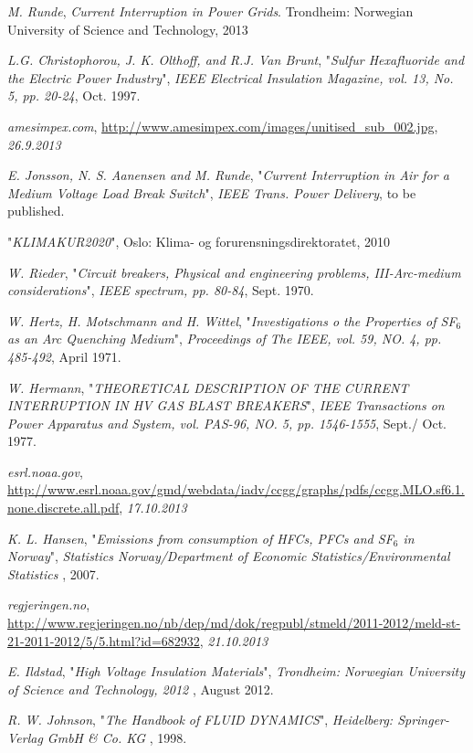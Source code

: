 \documentclass[10pt,a4paper]{article} %
\begin{document}
\begin{thebibliography}{10}


 \textit{M. Runde}, \textit{Current Interruption in Power Grids}. Trondheim: Norwegian University of Science and Technology, 2013

 \textit{L.G. Christophorou, J. K. Olthoff, and R.J. Van Brunt}, "\textit{Sulfur Hexafluoride and the Electric Power Industry}", \textit{IEEE Electrical Insulation Magazine, vol. 13, No. 5, pp. 20-24}, Oct. 1997.

 \textit{amesimpex.com}, \url{http://www.amesimpex.com/images/unitised_sub_002.jpg}, \textit{26.9.2013}

 \textit{E. Jonsson, N. S. Aanensen and M. Runde}, "\textit{Current Interruption in Air for a Medium Voltage Load Break Switch}", \textit{IEEE Trans. Power Delivery}, to be published.

 "\textit{KLIMAKUR2020}", Oslo: Klima- og forurensningsdirektoratet, 2010

 \textit{W. Rieder}, "\textit{Circuit breakers, Physical and engineering problems, III-Arc-medium considerations}", \textit{IEEE spectrum, pp. 80-84}, Sept. 1970.

 \textit{W. Hertz, H. Motschmann and H. Wittel}, "\textit{Investigations o the Properties of SF$_6$ as an Arc Quenching Medium}", \textit{Proceedings of The IEEE, vol. 59, NO. 4, pp. 485-492}, April 1971.

 \textit{W. Hermann}, "\textit{THEORETICAL DESCRIPTION OF THE CURRENT INTERRUPTION IN HV GAS BLAST BREAKERS}", \textit{IEEE Transactions on Power Apparatus and System, vol. PAS-96, NO. 5, pp. 1546-1555}, Sept./ Oct. 1977.

 \textit{esrl.noaa.gov}, \url{http://www.esrl.noaa.gov/gmd/webdata/iadv/ccgg/graphs/pdfs/ccgg.MLO.sf6.1.none.discrete.all.pdf}, \textit{17.10.2013}

 \textit{K. L. Hansen}, "\textit{Emissions from consumption of HFCs, PFCs and SF$_6$ in Norway}", \textit{Statistics Norway/Department of Economic Statistics/Environmental Statistics
}, 2007.

 \textit{regjeringen.no}, \url{http://www.regjeringen.no/nb/dep/md/dok/regpubl/stmeld/2011-2012/meld-st-21-2011-2012/5/5.html?id=682932}, \textit{21.10.2013}



 \textit{E. Ildstad}, "\textit{High Voltage Insulation Materials}", \textit{Trondheim: Norwegian University of Science and Technology, 2012
}, August 2012.

 \textit{R. W. Johnson}, "\textit{The Handbook of FLUID DYNAMICS}", \textit{Heidelberg: Springer-Verlag GmbH \& Co. KG
}, 1998.

\end{thebibliography}
\end{document}
